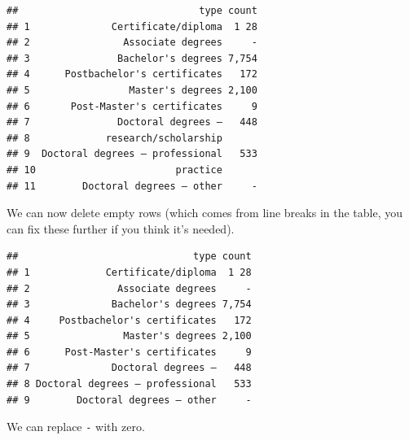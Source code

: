 \documentclass[
]{book}
\newenvironment{Shaded}{\begin{snugshade}}{\end{snugshade}}
\newcommand{\CommentTok}[1]{\textcolor[rgb]{0.56,0.35,0.01}{\textit{#1}}}
\newcommand{\DataTypeTok}[1]{\textcolor[rgb]{0.13,0.29,0.53}{#1}}
\newcommand{\DecValTok}[1]{\textcolor[rgb]{0.00,0.00,0.81}{#1}}
\newcommand{\KeywordTok}[1]{\textcolor[rgb]{0.13,0.29,0.53}{\textbf{#1}}}
\newcommand{\NormalTok}[1]{#1}
\newcommand{\OperatorTok}[1]{\textcolor[rgb]{0.81,0.36,0.00}{\textbf{#1}}}
\newcommand{\StringTok}[1]{\textcolor[rgb]{0.31,0.60,0.02}{#1}}
\begin{document}
\begin{verbatim}
##                               type count
## 1              Certificate/diploma  1 28
## 2                Associate degrees     -
## 3               Bachelor's degrees 7,754
## 4      Postbachelor's certificates   172
## 5                 Master's degrees 2,100
## 6       Post-Master's certificates     9
## 7               Doctoral degrees –   448
## 8             research/scholarship      
## 9  Doctoral degrees – professional   533
## 10                        practice      
## 11        Doctoral degrees – other     -
\end{verbatim}

We can now delete empty rows (which comes from line breaks in the table, you can fix these further if you think it's needed).

\begin{Shaded}
\end{Shaded}

\begin{verbatim}
##                              type count
## 1             Certificate/diploma  1 28
## 2               Associate degrees     -
## 3              Bachelor's degrees 7,754
## 4     Postbachelor's certificates   172
## 5                Master's degrees 2,100
## 6      Post-Master's certificates     9
## 7              Doctoral degrees –   448
## 8 Doctoral degrees – professional   533
## 9        Doctoral degrees – other     -
\end{verbatim}

We can replace \texttt{-} with zero.

\begin{Shaded}
\end{Shaded}
\end{document}
